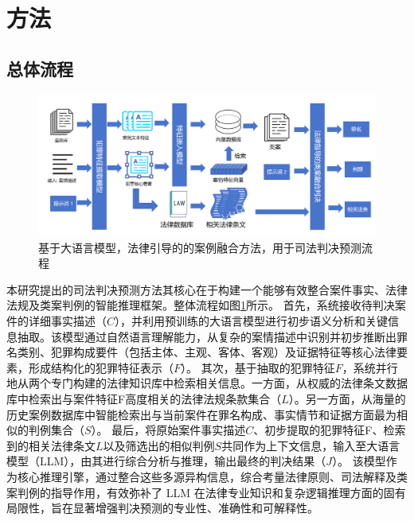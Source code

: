 \section{\heiti 方法}
\subsection{\heiti 总体流程}

\begin{figure}[H]
	\centering
	\includegraphics[width=1\linewidth]{fig/main.png}
	\caption{基于大语言模型，法律引导的的案例融合方法，用于司法判决预测流程}
	\label{fig:main}
\end{figure}

本研究提出的司法判决预测方法其核心在于构建一个能够有效整合案件事实、法律法规及类案判例的智能推理框架。整体流程如图\ref{fig:main}所示。
首先，系统接收待判决案件的详细事实描述（$C$），并利用预训练的大语言模型进行初步语义分析和关键信息抽取。该模型通过自然语言理解能力，从复杂的案情描述中识别并初步推断出罪名类别、犯罪构成要件（包括主体、主观、客体、客观）及证据特征等核心法律要素，形成结构化的犯罪特征表示（$F$）。
其次，基于抽取的犯罪特征$F$，系统并行地从两个专门构建的法律知识库中检索相关信息。一方面，从权威的法律条文数据库中检索出与案件特征F高度相关的法律法规条款集合（$L$）。另一方面，从海量的历史案例数据库中智能检索出与当前案件在罪名构成、事实情节和证据方面最为相似的判例集合（$S$）。
最后，将原始案件事实描述$C$、初步提取的犯罪特征F、检索到的相关法律条文$L$以及筛选出的相似判例$S$共同作为上下文信息，输入至大语言模型（LLM），由其进行综合分析与推理，输出最终的判决结果（$J$）。
该模型作为核心推理引擎，通过整合这些多源异构信息，综合考量法律原则、司法解释及类案判例的指导作用，有效弥补了 LLM 在法律专业知识和复杂逻辑推理方面的固有局限性，旨在显著增强判决预测的专业性、准确性和可解释性。

